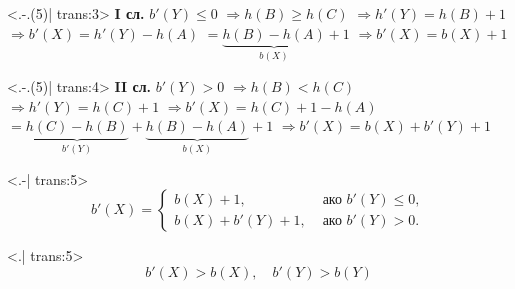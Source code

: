 \documentclass[alsotrans,beameroptions={aspectratio=169}]{beamerswitch}
\begin{document}
\begin{frame}
\begin{overlayarea}{\textwidth}{20ex}
    \begin{onlyenv}<.-.(5)| trans:3>
      \textbf{I сл. }$b'(Y) \leq 0$
      \onslide<+-> $\Rightarrow h(B) \geq h(C)$
      \onslide<+-> $\Rightarrow h'(Y) = h(B) + 1$
      \onslide<+-> $\Rightarrow b'(X) = h'(Y) - h(A)$
      \onslide<+-> $ = \underbrace{h(B) - h(A)}_{b(X)} + 1$
      \onslide<+-> $\Rightarrow b'(X) = b(X) + 1$
    \end{onlyenv}
    \onslide<+->
    \begin{onlyenv}<.-.(5)| trans:4>
      \textbf{II сл.} $b'(Y) > 0$
      \onslide<+-> $\Rightarrow h(B) < h(C)$
      \onslide<+-> $\Rightarrow h'(Y) = h(C) + 1$
      \onslide<+-> $\Rightarrow b'(X) = h(C) + 1 - h(A)$
      \onslide<+-> $ = \underbrace{h(C) - h(B)}_{b'(Y)} + \underbrace{h(B) - h(A)}_{b(X)} + 1$
      \onslide<+-> $\Rightarrow b'(X) = b(X) + b'(Y) + 1$
    \end{onlyenv}
    \onslide<+->
    \begin{onlyenv}<.-| trans:5>
      \begin{equation*}
        b'(X) =
        \begin{cases}
          b(X) + 1,&\text{ ако }b'(Y) \leq 0,\\
          b(X) + b'(Y) + 1,&\text{ ако }b'(Y) > 0.
        \end{cases}
      \end{equation*}
    \end{onlyenv}
    \onslide<+->
    \begin{onlyenv}<.| trans:5>
      \vspace{-2ex}
      \begin{equation*}
        b'(X) > b(X), \quad b'(Y) > b(Y)
      \end{equation*}
    \end{onlyenv}
  \end{overlayarea}
\end{frame}
\end{document}

